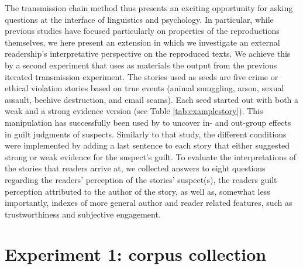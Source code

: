 \documentclass[10pt,letterpaper]{article}
\begin{document}
The transmission chain method thus presents an exciting opportunity for asking questions at the interface of linguistics and  psychology. In particular, while previous studies have focused particularly on properties of the reproductions themselves, we here present an extension in which we investigate an external readership's interpretative perspective on the reproduced texts. We achieve this by a second experiment that uses as materials the output from the previous iterated transmission experiment. The stories used as seeds are five crime or ethical violation stories based on true events (animal smuggling, arson, sexual assault, beehive destruction, and email scams). Each seed started out with both a weak and a strong evidence version (see Table \ref{tab:examplestory}). This manipulation has successfully been used by \cite{Van-Prooijen:2006} to uncover in- and out-group effects in guilt judgments of suspects. Similarly to that study, the different conditions were implemented by adding a last sentence to each story that either suggested strong or weak evidence for the suspect's guilt. To evaluate the interpretations of the stories that readers arrive at, we collected answers to eight questions regarding the readers' perception of the stories' suspect(s), the readers guilt perception attributed to the author of the story, as well as, somewhat less importantly, indexes of more general author and reader related features, such as trustworthiness and subjective engagement.

%
%


\section{Experiment 1: corpus collection}
\end{document}
